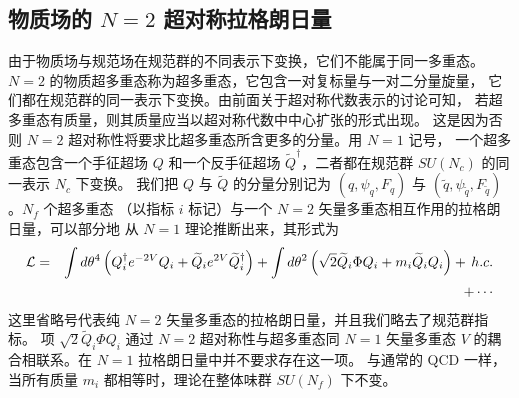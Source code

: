 \subsection{物质场的 $N=2$ 超对称拉格朗日量}

由于物质场与规范场在规范群的不同表示下变换，它们不能属于同一多重态。
$N=2$ 的物质超多重态称为超多重态，它包含一对复标量与一对二分量旋量，
它们都在规范群的同一表示下变换。由前面关于超对称代数表示的讨论可知，
若超多重态有质量，则其质量应当以超对称代数中中心扩张的形式出现。
这是因为否则 $N=2$ 超对称性将要求比超多重态所含更多的分量。用 $N=1$ 记号，
一个超多重态包含一个手征超场 $Q$ 和一个反手征超场
$\widetilde Q^\dagger$，二者都在规范群 $SU(N_c)$ 的同一表示 $N_c$ 下变换。
我们把 $Q$ 与 $\widetilde Q$ 的分量分别记为 $(q,\psi_q,F_q)$ 与
$(\widetilde q,\psi_{\widetilde q},F_{\widetilde q})$。$N_f$ 个超多重态
（以指标 $i$ 标记）与一个 $N=2$ 矢量多重态相互作用的拉格朗日量，可以部分地
从 $N=1$ 理论推断出来，其形式为
\begin{eqnarray}
{\cal L}=&&\int d\theta^4\left( Q^\dagger_i e^{-2V}Q_i +\widetilde Q_i
e^{2V}\widetilde Q^\dagger_i\right)+\int
d\theta^2\left(\sqrt{2}\widetilde Q_i\Phi Q_i+m_i\widetilde Q_i
Q_i\right)+\,h.c.\nonumber\\       &&+\cdots
\label{N=2hyper}
\end{eqnarray}
这里省略号代表纯 $N=2$ 矢量多重态的拉格朗日量，并且我们略去了规范群指标。
项 $\sqrt{2}\widetilde Q_i\Phi Q_i$ 通过 $N=2$ 超对称性与超多重态同
$N=1$ 矢量多重态 $V$ 的耦合相联系。在 $N=1$ 拉格朗日量中并不要求存在这一项。
与通常的 QCD 一样，当所有质量 $m_i$ 都相等时，理论在整体味群 $SU(N_f)$ 下不变。

